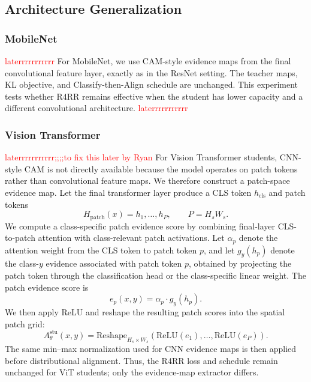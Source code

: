 \subsection{Architecture Generalization}
\label{sec:archgeneralize}


\subsubsection{MobileNet}
\textcolor{red}{laterrrrrrrrrrr}
For MobileNet, we use CAM-style evidence maps from the final convolutional feature layer, exactly as in the ResNet setting. The teacher maps, KL objective, and Classify-then-Align schedule are unchanged. This experiment tests whether R4RR remains effective when the student has lower capacity and a different convolutional architecture.
\textcolor{red}{laterrrrrrrrrrr}

\subsubsection{Vision Transformer}\label{sec:ViTstudent}
\textcolor{red}{\textcolor{red}{laterrrrrrrrrrr};;;;to fix this later by Ryan}
For Vision Transformer students, CNN-style CAM is not directly available because the model operates on patch tokens rather than convolutional feature maps. We therefore construct a patch-space evidence map. Let the final transformer layer produce a CLS token $h_{\mathrm{cls}}$ and patch tokens
\begin{equation}
H_{\mathrm{patch}}(x)={h_1,\ldots,h_P}, \qquad P=H_sW_s.
\end{equation}
We compute a class-specific patch evidence score by combining final-layer CLS-to-patch attention with class-relevant patch activations. Let $\alpha_p$ denote the attention weight from the CLS token to patch token $p$, and let $g_y(h_p)$ denote the class-$y$ evidence associated with patch token $p$, obtained by projecting the patch token through the classification head or the class-specific linear weight. The patch evidence score is
\begin{equation}
e_p(x,y)=\alpha_p \cdot g_y(h_p).
\end{equation}
We then apply ReLU and reshape the resulting patch scores into the spatial patch grid:
\begin{equation}
A^{\mathrm{stu}}_\theta(x,y)=
\mathrm{Reshape}_{H_s\times W_s}\left(
\mathrm{ReLU}(e_1),\ldots,\mathrm{ReLU}(e_P)
\right).
\end{equation}
The same min--max normalization used for CNN evidence maps is then applied before distributional alignment. Thus, the R4RR loss and schedule remain unchanged for ViT students; only the evidence-map extractor differs.


